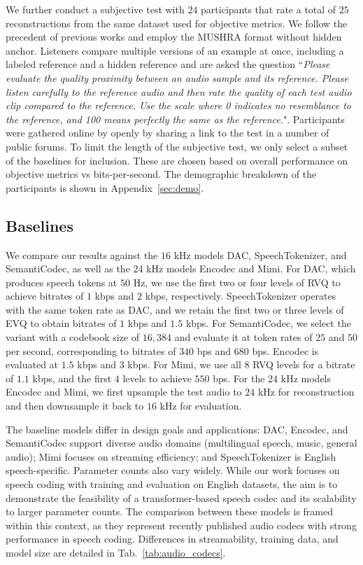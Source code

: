 \documentclass{article} %
\begin{document}
We further conduct a subjective test with $24$ participants that rate a total of $25$ reconstructions from the same dataset used for objective metrics. We follow the precedent of previous works \citep{zhang2023speechtokenizer, défossez2022high} and employ the MUSHRA \citep{schoeffler2018webmushra} format without hidden anchor. Listeners compare multiple versions of an example at once, including a labeled reference and a hidden reference and are asked the question ``\textit{Please evaluate the quality proximity between an audio sample and its reference. Please listen carefully to the reference audio and then rate the quality of each test audio clip compared to the reference. Use the scale where 0 indicates no resemblance to the reference, and 100 means perfectly the same as the reference.}".
Participants were gathered online by openly by sharing a link to the test in a number of public forums. To limit the length of the subjective test, we only select a subset of the baselines for inclusion. These are chosen based on overall performance on objective metrics vs bits-per-second. The demographic breakdown of the participants is shown in Appendix~\ref{sec:demo}.

\subsection{Baselines}
We compare our results against the $16$ kHz models DAC, SpeechTokenizer, and SemantiCodec, as well as the $24$ kHz models Encodec and Mimi. For DAC, which produces speech tokens at $50$ Hz, we use the first two or four levels of RVQ to achieve bitrates of $1$ kbps and $2$ kbps, respectively. SpeechTokenizer operates with the same token rate as DAC, and we retain the first two or three levels of EVQ to obtain bitrates of $1$ kbps and $1.5$ kbps. For SemantiCodec, we select the variant with a codebook size of $16,384$ and evaluate it at token rates of $25$ and $50$ per second, corresponding to bitrates of $340$ bps and $680$ bps. Encodec is evaluated at $1.5$ kbps and $3$ kbps. For Mimi, we use all $8$ RVQ levels for a bitrate of $1.1$ kbps, and the first $4$ levels to achieve $550$ bps. For the $24$ kHz models Encodec and Mimi, we first upsample the test audio to $24$ kHz for reconstruction and then downsample it back to $16$ kHz for evaluation. 

The baseline models differ in design goals and applications: DAC, Encodec, and SemantiCodec support diverse audio domains (multilingual speech, music, general audio); Mimi focuses on streaming efficiency; and SpeechTokenizer is English speech-specific. Parameter counts also vary widely. While our work focuses on speech coding with training and evaluation on English datasets, the aim is to demonstrate the feasibility of a transformer-based speech codec and its scalability to larger parameter counts. The comparison between these models is framed within this context, as they represent recently published audio codecs with strong performance in speech coding. Differences in streamability, training data, and model size are detailed in Tab.~\ref{tab:audio_codecs}.
\end{document}
